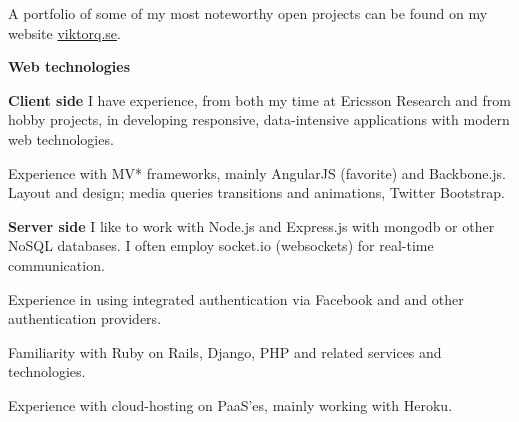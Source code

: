 \label{programming}

  A portfolio of some of my most noteworthy open projects can be found on my
  website \href{http://viktorq.se}{viktorq.se}.

\newenvironment{myitemize}{%
  \let\olditem\item
  \renewcommand\item[1][]{\olditem \textbf{##1}\hspace{0.35em}}
  \begin{list}{}{%
    \setlength{\leftmargin}{1.5em}
    \setlength{\itemsep}{0.25em}
    \setlength{\parskip}{0em}
    \setlength{\parsep}{0.25em}
  }
}{%
  \end{list}
}

\begin{myitemize}

  \item[Web technologies]
    \begin{list}{}{%
      \setlength{\leftmargin}{1.5em}
      \setlength{\itemsep}{0em}
      \setlength{\parskip}{0em}
      \setlength{\parsep}{0.25em}
    }
      \item[Client side]
        I have experience, from both my time at Ericsson Research and from hobby projects,
        in developing responsive, data-intensive applications
        with modern web technologies.

        Experience with MV* frameworks, mainly
        AngularJS (favorite) and Backbone.js. Layout and design; media queries
        transitions and animations, Twitter Bootstrap.
      \item[Server side]
        I like to work with Node.js and Express.js with mongodb or other NoSQL databases.
        I often employ socket.io (websockets) for real-time communication.

        Experience in using integrated authentication via Facebook and and other authentication
        providers.

        Familiarity with Ruby on Rails, Django, PHP and related services
        and technologies.

        Experience with cloud-hosting on PaaS'es, mainly working with Heroku.
    \end{list}


\end{myitemize}
